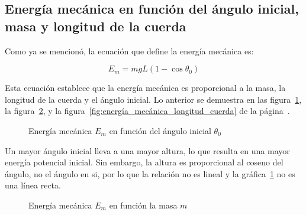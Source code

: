 \documentclass[letterpaper]{report}
\numberwithin{table}{section}
\begin{document}
\subsection{Energía mecánica en función del ángulo inicial, masa y
longitud de la cuerda}

Como ya se mencionó, la ecuación que define la energía mecánica es:

\begin{equation}
  E_{m} = mgL(1 - \cos \theta_{0})
\end{equation}

Esta ecuación establece que la energía mecánica es proporcional a la
masa, la longitud de la cuerda y el ángulo inicial. Lo anterior se
demuestra en las figura~\ref{fig:energía_mecánica_ángulo_inicial}, la
figura~\ref{fig:energía_mecánica_masa}, y la
figura~\ref{fig:energía_mecánica_longitud_cuerda} de la
página~\pageref{fig:energía_mecánica_ángulo_inicial}.

\begin{figure}[H]
  \centering
  \caption{Energía mecánica $E_{m}$ en función del ángulo inicial
  $\theta_{0}$}\label{fig:energía_mecánica_ángulo_inicial}
\end{figure}

Un mayor ángulo inicial lleva a una mayor altura, lo que resulta en
una mayor energía potencial inicial. Sin embargo, la altura es
proporcional al coseno del ángulo, no el ángulo en si, por lo que la
relación no es lineal y la
gráfica~\ref{fig:energía_mecánica_ángulo_inicial} no es una línea recta.

\begin{figure}[H]
  \centering
  \caption{Energía mecánica $E_{m}$ en función la masa
  $m$}\label{fig:energía_mecánica_masa}
\end{figure}
\end{document}
